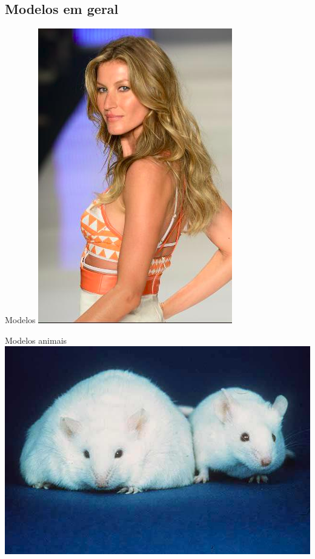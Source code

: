 \documentclass{beamer}
\begin{document}
\subsection{Modelos em geral}

\begin{frame}{Modelos}
  \centering
  \includegraphics[height=\textheight]{modelos/gi}
\end{frame}

\begin{frame}{Modelos animais}
  \centering
  \includegraphics[width=\textwidth]{modelos/Fatmouse}
\end{frame}
\end{document}
